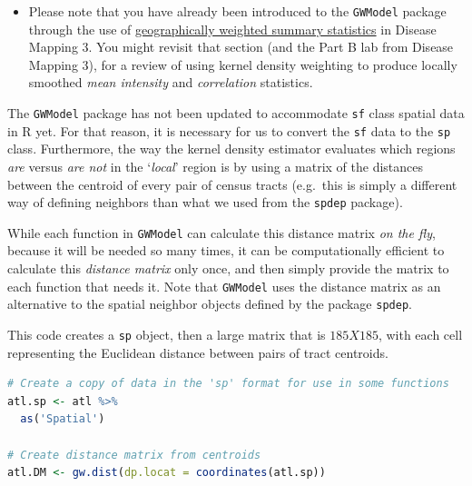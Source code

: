 \documentclass[
]{book}
\newcommand{\passthrough}[1]{#1}
\newenvironment{rmdblock}[1]
  {%
  \begin{itemize}
  \renewcommand{\labelitemi}{
    \raisebox{-.7\height}[0pt][0pt]{
      {\setkeys{Gin}{width=3em,keepaspectratio}\texttt{[image: images/\#1]}}
    }
  }
  \item
  }
  {
  \end{itemize}
  }
\newenvironment{rmdnote}
  {\begin{rmdblock}{note}}
  {\end{rmdblock}}
\begin{document}
\begin{rmdnote}
Please note that you have already been introduced to the \passthrough{\lstinline!GWModel!} package through the use of \protect\hyperlink{gwss}{geographically weighted summary statistics} in Disease Mapping 3. You might revisit that section (and the Part B lab from Disease Mapping 3), for a review of using kernel density weighting to produce locally smoothed \emph{mean intensity} and \emph{correlation} statistics.
\end{rmdnote}

The \passthrough{\lstinline!GWModel!} package has not been updated to accommodate \passthrough{\lstinline!sf!} class spatial data in R yet. For that reason, it is necessary for us to convert the \passthrough{\lstinline!sf!} data to the \passthrough{\lstinline!sp!} class. Furthermore, the way the kernel density estimator evaluates which regions \emph{are} versus \emph{are not} in the `\emph{local}' region is by using a matrix of the distances between the centroid of every pair of census tracts (e.g.~this is simply a different way of defining neighbors than what we used from the \passthrough{\lstinline!spdep!} package).

While each function in \passthrough{\lstinline!GWModel!} can calculate this distance matrix \emph{on the fly}, because it will be needed so many times, it can be computationally efficient to calculate this \emph{distance matrix} only once, and then simply provide the matrix to each function that needs it. Note that \passthrough{\lstinline!GWModel!} uses the distance matrix as an alternative to the spatial neighbor objects defined by the package \passthrough{\lstinline!spdep!}.

This code creates a \passthrough{\lstinline!sp!} object, then a large matrix that is \(185 X 185\), with each cell representing the Euclidean distance between pairs of tract centroids.

\begin{lstlisting}[language=R]
# Create a copy of data in the 'sp' format for use in some functions
atl.sp <- atl %>%
  as('Spatial')

# Create distance matrix from centroids
atl.DM <- gw.dist(dp.locat = coordinates(atl.sp))
\end{lstlisting}
\end{document}
